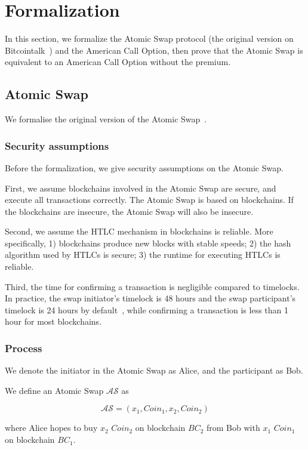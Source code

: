 \section{Formalization}
\label{sec:formalization}

In this section, we formalize the Atomic Swap protocol (the original version on Bitcointalk~\cite{nolan2013alt}) and the American Call Option,
then prove that the Atomic Swap is equivalent to an American Call Option without the premium.





\subsection{Atomic Swap}

We formalise the original version of the Atomic Swap~\cite{nolan2013alt}.

\subsubsection{Security assumptions}

Before the formalization, we give security assumptions on the Atomic Swap.

First, we assume blockchains involved in the Atomic Swap are secure, and execute all transactions correctly.
The Atomic Swap is based on blockchains.
If the blockchains are insecure, the Atomic Swap will also be insecure.

Second, we assume the HTLC mechanism in blockchains is reliable.
More specifically,
1) blockchains produce new blocks with stable speeds;
2) the hash algorithm used by HTLCs is secure;
3) the runtime for executing HTLCs is reliable.


Third, the time for confirming a transaction is negligible compared to timelocks.
In practice, the swap initiator's timelock is 48 hours and the swap participant's timelock is 24 hours by default~\cite{nolan2013alt}, while confirming a transaction is less than 1 hour for most blockchains.


\subsubsection{Process}

We denote the initiator in the Atomic Swap as Alice, and the participant as Bob.

\begin{definition}
We define an Atomic Swap $\mathcal{AS}$ as

$$\mathcal{AS} = (x_1, Coin_1, x_2, Coin_2)$$

where Alice hopes to buy $x_2$ $Coin_2$ on blockchain $BC_2$ from Bob with $x_1$ $Coin_1$ on blockchain $BC_1$.
\end{definition}


